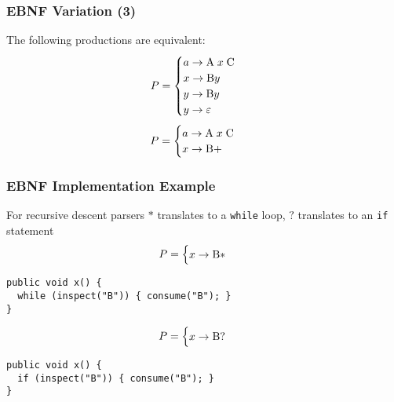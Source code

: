 \documentclass[aspectratio=169]{beamer}
\begin{document}
\begin{frame}
\frametitle{EBNF Variation (3)}

The following productions are equivalent:
\begin{align*}
P &= \begin{cases}a \rightarrow \text{\lstinline{A}} \; x \;
     \text{\lstinline{C}}\\
     x \rightarrow \text{\lstinline{B}} y\\
     y \rightarrow \text{\lstinline{B}} y\\
     y \rightarrow \varepsilon \end{cases}
\end{align*}
\begin{align*}
P &= \begin{cases}a \rightarrow \text{\lstinline{A}} \; x \;
     \text{\lstinline{C}}\\
     x \rightarrow \text{\lstinline{B}}+ \end{cases}
\end{align*}
\end{frame}

\begin{frame}[fragile]
\frametitle{EBNF Implementation Example}

For recursive descent parsers $*$ translates to a \lstinline{while} loop, $?$
translates to an \lstinline{if} statement
\begin{align*}
P &= \begin{cases}x \rightarrow \text{\lstinline{B}}* \end{cases}
\end{align*}
\begin{lstlisting}[backgroundcolor=\color{solarizedRebase02}]
public void x() {
  while (inspect("B")) { consume("B"); }
}
\end{lstlisting}
\begin{align*}
P &= \begin{cases}x \rightarrow \text{\lstinline{B}}? \end{cases}
\end{align*}
\begin{lstlisting}[backgroundcolor=\color{solarizedRebase02}]
public void x() {
  if (inspect("B")) { consume("B"); }
}
\end{lstlisting}
\end{frame}
\end{document}
